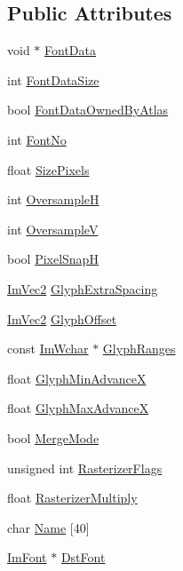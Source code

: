 \subsection*{Public Attributes}
\begin{DoxyCompactItemize}
\item 
void $\ast$ \mbox{\hyperlink{struct_im_font_config_a0265861de7ba7b0d953e1c97e7a50cf3}{Font\+Data}}
\item 
int \mbox{\hyperlink{struct_im_font_config_a39df7ad3bb496421ce2cc5d2428345ef}{Font\+Data\+Size}}
\item 
bool \mbox{\hyperlink{struct_im_font_config_a99dfbf61ef79cee89b6f03e17cbe63b4}{Font\+Data\+Owned\+By\+Atlas}}
\item 
int \mbox{\hyperlink{struct_im_font_config_ab37ee3d5cf76000a4000e9296161e527}{Font\+No}}
\item 
float \mbox{\hyperlink{struct_im_font_config_a2eff9cc7a11461414402f08ab910d277}{Size\+Pixels}}
\item 
int \mbox{\hyperlink{struct_im_font_config_ab460df0d8019ffa8d124e8988c710910}{OversampleH}}
\item 
int \mbox{\hyperlink{struct_im_font_config_a8018f84c60bfafb2b4629aeb77a047cb}{OversampleV}}
\item 
bool \mbox{\hyperlink{struct_im_font_config_a635b5fa03934467891fa949a037b5b89}{Pixel\+SnapH}}
\item 
\mbox{\hyperlink{struct_im_vec2}{Im\+Vec2}} \mbox{\hyperlink{struct_im_font_config_a82db103689b1c434ec92875721967c07}{Glyph\+Extra\+Spacing}}
\item 
\mbox{\hyperlink{struct_im_vec2}{Im\+Vec2}} \mbox{\hyperlink{struct_im_font_config_a290a81956fdcb7ad3b5e3152594db121}{Glyph\+Offset}}
\item 
const \mbox{\hyperlink{imgui_8h_af2c7badaf05a0008e15ef76d40875e97}{Im\+Wchar}} $\ast$ \mbox{\hyperlink{struct_im_font_config_aa174ceff80323012cd1b717d864258dd}{Glyph\+Ranges}}
\item 
float \mbox{\hyperlink{struct_im_font_config_a3015c4ad464a7b5abeb5b926e8896bf6}{Glyph\+Min\+AdvanceX}}
\item 
float \mbox{\hyperlink{struct_im_font_config_af9040efaa5998aef3add4b629d7dc255}{Glyph\+Max\+AdvanceX}}
\item 
bool \mbox{\hyperlink{struct_im_font_config_ad5cab281622e5bdec8e2d55cadc5601e}{Merge\+Mode}}
\item 
unsigned int \mbox{\hyperlink{struct_im_font_config_a80d05eea7733731a3e9ac1d9e905e5b3}{Rasterizer\+Flags}}
\item 
float \mbox{\hyperlink{struct_im_font_config_a9365265cc52098a8ecf89ff47f6106f2}{Rasterizer\+Multiply}}
\item 
char \mbox{\hyperlink{struct_im_font_config_a12d3c014914d3b77533e219a013dc750}{Name}} \mbox{[}40\mbox{]}
\item 
\mbox{\hyperlink{struct_im_font}{Im\+Font}} $\ast$ \mbox{\hyperlink{struct_im_font_config_a561773c311f6cf6de00642c2801e7b92}{Dst\+Font}}
\end{DoxyCompactItemize}


